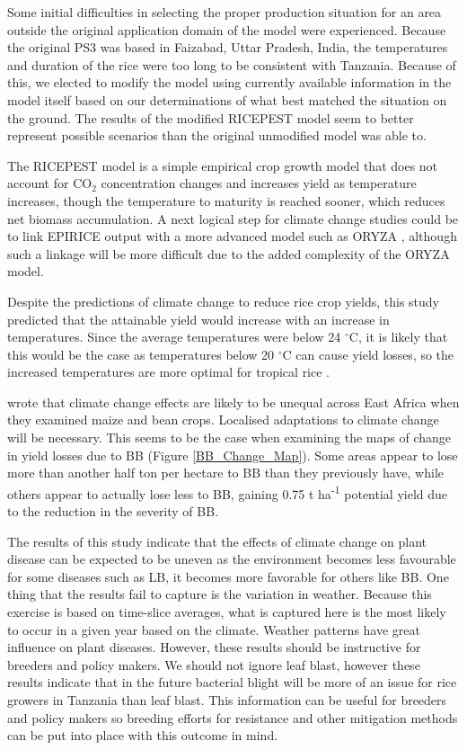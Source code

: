 \documentclass[preprint,review,12pt]{elsarticle}
\begin{document}
    Some initial difficulties in selecting the proper production situation for an area outside the original application domain of the model were experienced. Because the original PS3 was based in Faizabad, Uttar Pradesh, India, the temperatures and duration of the rice were too long to be consistent with Tanzania. Because of this, we elected to modify the model using currently available information in the model itself based on our determinations of what best matched the situation on the ground. The results of the modified RICEPEST model seem to better represent possible scenarios than the original unmodified model was able to.
    
    The RICEPEST model is a simple empirical crop growth model that does not account for CO$_2$ concentration changes and increases yield as temperature increases, though the temperature to maturity is reached sooner, which reduces net biomass accumulation. A next logical step for climate change studies could be to link EPIRICE output with a more advanced model such as ORYZA \cite{Oryza}, although such a linkage will be more difficult due to the added complexity of the ORYZA model.
    
    Despite the predictions of climate change to reduce rice crop yields, this study predicted that the attainable yield would increase with an increase in temperatures. Since the average temperatures were below 24 $^{\circ}$C, it is likely that this would be the case as temperatures below 20 $^{\circ}$C can cause yield losses, so the increased temperatures are more optimal for tropical rice \cite{Yoshida}.
            
    \citet{Thornton2009} wrote that climate change effects are likely to be unequal across East Africa when they examined maize and bean crops. Localised adaptations to climate change will be necessary. This seems to be the case when examining the maps of change in yield losses due to BB (Figure \ref{BB_Change_Map}). Some areas appear to lose more than another half ton per hectare to BB than they previously have, while others appear to actually lose less to BB, gaining 0.75 t ha\textsuperscript{-1} potential yield due to the reduction in the severity of BB.
    
    The results of this study indicate that the effects of climate change on plant disease can be expected to be uneven as the environment becomes less favourable for some diseases such as LB, it becomes more favorable for others like BB. One thing that the results fail to capture is the variation in weather. Because this exercise is based on time-slice averages, what is captured here is the most likely to occur in a given year based on the climate. Weather patterns have great influence on plant diseases. However, these results should be instructive for breeders and policy makers. We should not ignore leaf blast, however these results indicate that in the future bacterial blight will be more of an issue for rice growers in Tanzania than leaf blast. This information can be useful for breeders and policy makers so breeding efforts for resistance and other mitigation methods can be put into place with this outcome in mind.
    
\end{document}
